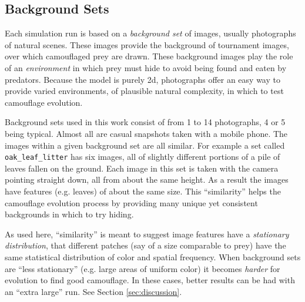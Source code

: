 \documentclass[acmtog,
    anonymous,
    review
    ]{acmart}
\newcommand{\jargon}[1]{\textit{#1}}
\begin{document}
\subsection{Background Sets}
\label{subsec:background_sets}
Each simulation run is based on a \jargon{background set} of images, usually photographs of natural scenes. These images provide the background of tournament images, over which camouflaged prey are drawn. These background images play the role of an \jargon{environment} in which prey must hide to avoid being found and eaten by predators. Because the model is purely 2d, photographs offer an easy way to provide varied environments, of plausible natural complexity, in which to test camouflage evolution.
\par
Background sets used in this work consist of from 1 to 14 photographs, 4 or 5 being typical. Almost all are casual snapshots taken with a mobile phone. The images within a given background set are all similar. For example a set called \texttt{oak\_leaf\_litter} has six images, all of slightly different portions of a pile of leaves fallen on the ground. Each image in this set is taken with the camera pointing straight down, all from about the same height. As a result the images have features (e.g. leaves) of about the same size. This “similarity” helps the camouflage evolution process by providing many unique yet consistent backgrounds in which to try hiding.
\par
As used here, “similarity” is meant to suggest image features have a \jargon{stationary distribution}, that different patches (say of a size comparable to prey) have the same statistical distribution of color and spatial frequency. When background sets are “less stationary” (e.g. large areas of uniform color) it becomes \jargon{harder} for evolution to find good camouflage. In these cases, better results can be had with an “extra large” run. See Section \ref{sec:discussion}.
\par

\end{document}
